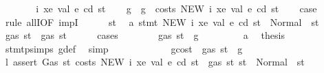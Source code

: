 \begin{isabellebody}
\ \ \isamarkupfalse%
\isanewline
{}\isamarkupfalse%
\isanewline
\ \ \isamarkupfalse%
\ {\isacharparenleft}{\kern0pt}{}{}\ i\ xe\ val\ e\ cd\ st{\isacharparenright}{\kern0pt}\isanewline
\ \ \isamarkupfalse%
\ g\ \ {\isachardoublequoteopen}g\ {\isacharequal}{\kern0pt}\ costs\ {\isacharparenleft}{\kern0pt}NEW\ i\ xe\ val{\isacharparenright}{\kern0pt}\ e\ cd\ st{\isachardoublequoteclose}\isanewline
\ \ \isamarkupfalse%
\ {\isacharquery}{\kern0pt}case\isanewline
\ \ \isamarkupfalse%
\ {\isacharparenleft}{\kern0pt}rule\ allI{\isacharbrackleft}{\kern0pt}OF\ impI{\isacharbrackright}{\kern0pt}{\isacharparenright}{\kern0pt}\isanewline
\ \ \ \ \isamarkupfalse%
\ st{}{\isacharprime}{\kern0pt}\ \isamarkupfalse%
\ a{}{\isacharcolon}{\kern0pt}\ {\isachardoublequoteopen}stmt\ {\isacharparenleft}{\kern0pt}NEW\ i\ xe\ val{\isacharparenright}{\kern0pt}\ e\ cd\ st\ {\isacharequal}{\kern0pt}\ Normal\ {\isacharparenleft}{\kern0pt}{\isacharparenleft}{\kern0pt}{\isacharparenright}{\kern0pt}{\isacharcomma}{\kern0pt}\ st{}{\isacharprime}{\kern0pt}{\isacharparenright}{\kern0pt}{\isachardoublequoteclose}\isanewline
\ \ \ \ \isamarkupfalse%
\ {\isachardoublequoteopen}gas\ st{}{\isacharprime}{\kern0pt}\ {\isasymle}\ gas\ st{\isachardoublequoteclose}\isanewline
\ \ \ \ \isamarkupfalse%
\ {\isacharparenleft}{\kern0pt}cases{\isacharparenright}{\kern0pt}\isanewline
\ \ \ \ \ \ \isamarkupfalse%
\ {\isachardoublequoteopen}gas\ st\ {\isasymle}\ g{\isachardoublequoteclose}\isanewline
\ \ \ \ \ \ \isamarkupfalse%
\ {}{}{\isacharparenleft}{\kern0pt}{}{\isacharparenright}{\kern0pt}\ a{}\ \isamarkupfalse%
\ {\isacharquery}{\kern0pt}thesis\ \isamarkupfalse%
\ stmt{\isachardot}{\kern0pt}psimps{\isacharparenleft}{\kern0pt}{}{}{\isacharparenright}{\kern0pt}\ g{\isacharunderscore}{\kern0pt}def\ \isamarkupfalse%
\ simp\isanewline
\ \ \ \ \isamarkupfalse%
\isanewline
\ \ \ \ \ \ \isamarkupfalse%
\ gcost{\isacharcolon}{\kern0pt}\ {\isachardoublequoteopen}{\isasymnot}\ gas\ st\ {\isasymle}\ g{\isachardoublequoteclose}\isanewline
\ \ \ \ \ \ \isamarkupfalse%
\ \isamarkupfalse%
\ l{}{\isacharcolon}{\kern0pt}\ {\isachardoublequoteopen}assert\ Gas\ {\isacharparenleft}{\kern0pt}{\isasymlambda}st{\isachardot}{\kern0pt}\ costs\ {\isacharparenleft}{\kern0pt}NEW\ i\ xe\ val{\isacharparenright}{\kern0pt}\ e\ cd\ st\ {\isacharless}{\kern0pt}\ gas\ st{\isacharparenright}{\kern0pt}\ st\ {\isacharequal}{\kern0pt}\ Normal\ {\isacharparenleft}{\kern0pt}{\isacharparenleft}{\kern0pt}{\isacharparenright}{\kern0pt}{\isacharcomma}{\kern0pt}\ st{\isacharparenright}{\kern0pt}\ {\isachardoublequoteclose}\ \isamarkupfalse%

\end{isabellebody}
